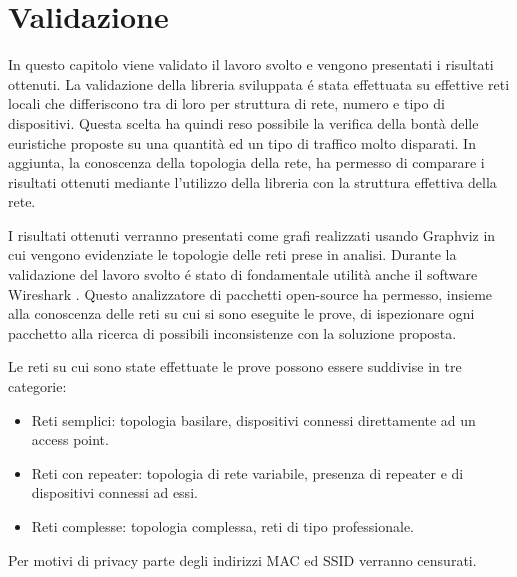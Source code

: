 \chapter{Validazione}

In questo capitolo viene validato il lavoro svolto e vengono presentati i risultati ottenuti.
La validazione della libreria sviluppata \'e stata effettuata su effettive reti locali che differiscono tra di loro per struttura di rete, numero e tipo di dispositivi.
Questa scelta ha quindi reso possibile la verifica della bont\`a delle euristiche proposte su una quantit\`a ed un tipo di traffico molto disparati.
In aggiunta, la conoscenza della topologia della rete, ha permesso di comparare i risultati ottenuti mediante l'utilizzo della libreria con la struttura effettiva della rete.

I risultati ottenuti verranno presentati come grafi realizzati usando Graphviz \cite{graphviz} in cui vengono evidenziate le topologie delle reti prese in analisi.
Durante la validazione del lavoro svolto \'e stato di fondamentale utilit\`a anche il software Wireshark \cite{wireshark}.
Questo analizzatore di pacchetti open-source ha permesso, insieme alla conoscenza delle reti su cui si sono eseguite le prove, di ispezionare ogni pacchetto alla ricerca di possibili inconsistenze con la soluzione proposta. 

Le reti su cui sono state effettuate le prove possono essere suddivise in tre categorie:
\begin{itemize}
	\item Reti semplici: topologia basilare, dispositivi connessi direttamente ad un access point.
	\item Reti con repeater: topologia di rete variabile, presenza di repeater e di dispositivi connessi ad essi.
	\item Reti complesse: topologia complessa, reti di tipo professionale.
\end{itemize}
Per motivi di privacy parte degli indirizzi MAC ed SSID verranno censurati.



